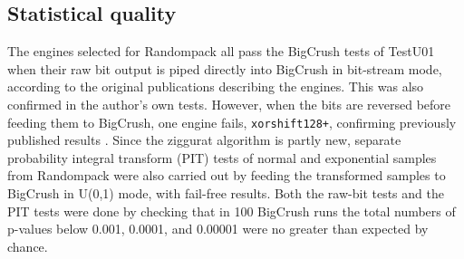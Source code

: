 \documentclass[manuscript,screen,review]{acmart}
\begin{document}
\subsection{Statistical quality}
The engines selected for Randompack all pass the BigCrush tests of
TestU01 when their raw bit output is piped directly into BigCrush in
bit-stream mode, according to the original publications describing the
engines. This was also confirmed in the author's own tests. However,
when the bits are reversed before feeding them to BigCrush, one engine
fails, \texttt{xorshift128+}, confirming previously published results
\cite{lemire2019xorshiftfails}. Since the ziggurat algorithm is partly
new, separate probability integral transform (PIT) tests
\cite{diebold1998evaluating} of normal and exponential samples from
Randompack were also carried out by feeding the transformed samples to
BigCrush in U(0,1) mode, with fail-free results. Both the raw-bit
tests and the PIT tests were done by checking that in 100 BigCrush
runs the total numbers of p-values below 0.001, 0.0001, and 0.00001
were no greater than expected by chance.
\end{document}

